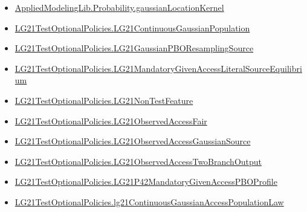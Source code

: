 \documentclass[10pt]{article}
\begin{document}
\begin{itemize}\raggedright
\item \hyperlink{governing-declaration-6c289c06beead2ba}{Applied\allowbreak{}Modeling\allowbreak{}Lib.\allowbreak{}Probability.\allowbreak{}gaussian\allowbreak{}Location\allowbreak{}Kernel}
\item \hyperlink{paper-prerequisite-f5e1c886d250142b}{LG21\allowbreak{}Test\allowbreak{}Optional\allowbreak{}Policies.\allowbreak{}LG21\allowbreak{}Continuous\allowbreak{}Gaussian\allowbreak{}Population}
\item \hyperlink{governing-declaration-c8b98fdcfb30482e}{LG21\allowbreak{}Test\allowbreak{}Optional\allowbreak{}Policies.\allowbreak{}LG21\allowbreak{}Gaussian\allowbreak{}PBO\allowbreak{}Resampling\allowbreak{}Source}
\item \hyperlink{governing-declaration-97e3a6cd16347ca5}{LG21\allowbreak{}Test\allowbreak{}Optional\allowbreak{}Policies.\allowbreak{}LG21\allowbreak{}Mandatory\allowbreak{}Given\allowbreak{}Access\allowbreak{}Literal\allowbreak{}Source\allowbreak{}Equilibrium}
\item \hyperlink{governing-declaration-81cb73bf3869c56d}{LG21\allowbreak{}Test\allowbreak{}Optional\allowbreak{}Policies.\allowbreak{}LG21\allowbreak{}Non\allowbreak{}Test\allowbreak{}Feature}
\item \hyperlink{governing-declaration-cf5f3565b859b137}{LG21\allowbreak{}Test\allowbreak{}Optional\allowbreak{}Policies.\allowbreak{}LG21\allowbreak{}Observed\allowbreak{}Access\allowbreak{}Fair}
\item \hyperlink{governing-declaration-2b8ecce015c6e865}{LG21\allowbreak{}Test\allowbreak{}Optional\allowbreak{}Policies.\allowbreak{}LG21\allowbreak{}Observed\allowbreak{}Access\allowbreak{}Gaussian\allowbreak{}Source}
\item \hyperlink{governing-declaration-f2c986c14a1e4187}{LG21\allowbreak{}Test\allowbreak{}Optional\allowbreak{}Policies.\allowbreak{}LG21\allowbreak{}Observed\allowbreak{}Access\allowbreak{}Two\allowbreak{}Branch\allowbreak{}Output}
\item \hyperlink{governing-declaration-90af79878db4d892}{LG21\allowbreak{}Test\allowbreak{}Optional\allowbreak{}Policies.\allowbreak{}LG21\allowbreak{}P42\allowbreak{}Mandatory\allowbreak{}Given\allowbreak{}Access\allowbreak{}PBO\allowbreak{}Profile}
\item \hyperlink{governing-declaration-fa49b6c4b938413f}{LG21\allowbreak{}Test\allowbreak{}Optional\allowbreak{}Policies.\allowbreak{}lg21\allowbreak{}Continuous\allowbreak{}Gaussian\allowbreak{}Access\allowbreak{}Population\allowbreak{}Law}

\end{itemize}
\end{document}
